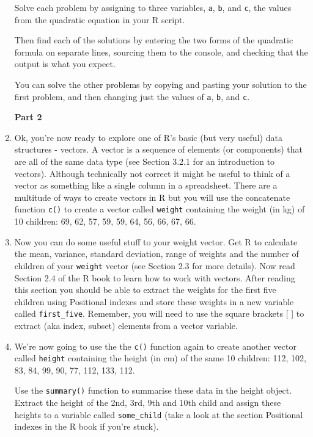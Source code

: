 \documentclass[12pt]{article}
\newcommand{\lst}[1]{\lstinline{#1}}
\begin{document}
\begin{enumerate}
 Solve each problem by assigning to three variables, \lstinline{a},
 \lstinline{b}, and
 \lstinline{c}, the values from the quadratic equation
 in your R script.
 
 Then find each of the solutions by entering the two forms of the quadratic 
 formula on separate lines, sourcing them to the console, and checking
 that the output is what you expect.
 
 You can solve the other problems by copying and pasting
 your solution to the first problem, and then changing just the values
 of  \lstinline{a},
 \lstinline{b}, and
 \lstinline{c}.
 
 

\centerline{\bf Part 2}

\item  Ok, you’re now ready to explore one of R’s basic (but very useful) data structures - vectors. A vector is a sequence of elements (or components) that are all of the same data type (see Section 3.2.1 for an introduction to vectors). Although technically not correct it might be useful to think of a vector as something like a single column in a spreadsheet. There are a multitude of ways to create vectors in R but you will use the concatenate function \lst{c()}
 to create a vector called \lst{weight} containing the weight (in kg) of 10 children: 
 69, 62, 57, 59, 59, 64, 56, 66, 67, 66.

 

\item Now you can do some useful stuff to your weight vector. Get R to calculate the mean, variance, standard deviation, range of weights and the number of children of your \lst{weight} vector (see Section 2.3 for more details). Now read Section 2.4 of the R book to learn how to work with vectors. After reading this section you should be able to extract the weights for the first five children using Positional indexes and store these weights in a new variable called 
\lstinline{first_five}. Remember, you will need to use the square brackets [ ] to extract (aka index, subset) elements from a vector variable.

 

\item We’re now going to use the the \lst{c()} function again to create another vector called 
\lst{height} containing the height (in cm) of the same 10 children: 112, 102, 83, 84, 99, 90, 77, 112, 133, 112. 

Use the \lst{summary()} function to summarise these data in the height object. Extract the height of the 2nd, 3rd, 9th and 10th child and assign these heights to a variable called \lst{some_child} (take a look at the section Positional indexes in the R book if you’re stuck). 


\end{enumerate}
\end{document}
